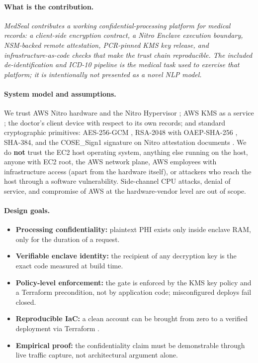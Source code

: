 \documentclass[11pt]{article}
\begin{document}
\paragraph{What is the contribution.} \emph{MedSeal contributes a
working confidential-processing platform for medical records: a
client-side encryption contract, a Nitro Enclave execution boundary,
NSM-backed remote attestation, PCR-pinned KMS key release, and
infrastructure-as-code checks that make the trust chain reproducible.
The included de-identification and ICD-10 pipeline is the medical task
used to exercise that platform; it is intentionally not presented as a
novel NLP model.}

\paragraph{System model and assumptions.}
We trust AWS Nitro hardware and the Nitro Hypervisor
\cite{nitrosystem}; AWS KMS as a service \cite{kmsattested,
kmsenclaves}; the doctor's client device with respect to its own
records; and standard cryptographic primitives: AES-256-GCM
\cite{nistgcm}, RSA-2048 with OAEP-SHA-256 \cite{rfc8017}, SHA-384,
and the COSE\_Sign1 signature on Nitro attestation documents
\cite{rfc9052}.
We do \textbf{not} trust the EC2 host operating system, anything
else running on the host, anyone with EC2 root, the AWS network
plane, AWS employees with infrastructure access (apart from the
hardware itself), or attackers who reach the host through a
software vulnerability. Side-channel CPU attacks, denial of
service, and compromise of AWS at the hardware-vendor level are out
of scope.

\paragraph{Design goals.}
\begin{itemize}\setlength{\itemsep}{1pt}
    \item \textbf{Processing confidentiality:} plaintext PHI exists
    only inside enclave RAM, only for the duration of a request.
    \item \textbf{Verifiable enclave identity:} the recipient of any
    decryption key is the exact code measured at build time.
    \item \textbf{Policy-level enforcement:} the gate is enforced by
    the KMS key policy and a Terraform precondition, not by
    application code; misconfigured deploys fail closed.
    \item \textbf{Reproducible IaC:} a clean account can be brought
    from zero to a verified deployment via Terraform
    \cite{terraform}.
    \item \textbf{Empirical proof:} the confidentiality claim must
    be demonstrable through live traffic capture, not architectural
    argument alone.
\end{itemize}
\end{document}
